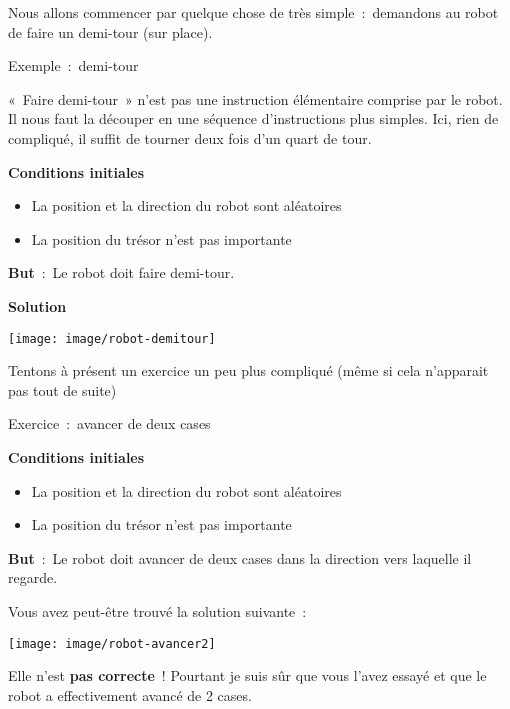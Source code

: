 	Nous allons commencer par quelque chose de très simple~:~demandons au
	robot de faire un demi-tour (sur place).

	\begin{Emphase}[exercice]{Exemple~:~demi-tour}

		«~Faire demi-tour~» n’est pas une instruction
		élémentaire comprise par le robot. Il nous faut la découper en une
		séquence d’instructions plus simples. Ici, rien de
		compliqué, il suffit de tourner deux fois d’un quart
		de tour.

		\textbf{Conditions initiales}

		\begin{itemize}
		\item La position et la direction du robot sont aléatoires
		\item La position du trésor n’est pas importante
		\end{itemize}

		\textbf{But}~:~Le robot doit faire demi-tour.

		\textbf{Solution}
		
		\texttt{[image: image/robot-demitour]}
		
	\end{Emphase}

	Tentons à présent un exercice un peu plus compliqué
	(même si cela n’apparait pas tout de suite)

	
	\begin{Emphase}[exercice]{Exercice~:~avancer de deux cases}

		\textbf{Conditions initiales}

		\begin{itemize}
		\item La position et la direction du robot sont aléatoires
		\item La position du trésor n’est pas importante
		\end{itemize}
		
		\textbf{But}~:~Le robot doit avancer de deux cases dans la direction
		vers laquelle il regarde.

	\end{Emphase}

	Vous avez peut-être trouvé la solution suivante~:
		
	\texttt{[image: image/robot-avancer2]}
	
	Elle n’est \textbf{pas correcte}~! Pourtant je suis sûr
	que vous l’avez essayé et que le robot a effectivement
	avancé de 2 cases. 
	
